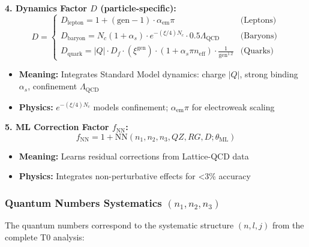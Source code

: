 	\textbf{4. Dynamics Factor $D$ (particle-specific):}
	\begin{equation}
		D = 
		\begin{cases} 
			D_{\text{lepton}} = 1 + (\text{gen} - 1) \cdot \alpha_{\text{em}} \pi & \text{(Leptons)} \\
			D_{\text{baryon}} = N_c (1 + \alpha_s) \cdot e^{-(\xi/4) N_c} \cdot 0.5 \Lambda_{\text{QCD}} & \text{(Baryons)} \\
			D_{\text{quark}} = |Q| \cdot D_f \cdot (\xi^{\text{gen}}) \cdot (1 + \alpha_s \pi n_{\text{eff}}) \cdot \frac{1}{\text{gen}^{1.2}} & \text{(Quarks)}
		\end{cases}
	\end{equation}
	\begin{itemize}
		\item \textbf{Meaning:} Integrates Standard Model dynamics: charge $|Q|$, strong binding $\alpha_s$, confinement $\Lambda_{\text{QCD}}$
		\item \textbf{Physics:} $e^{-(\xi/4) N_c}$ models confinement; $\alpha_{\text{em}} \pi$ for electroweak scaling
	\end{itemize}
	
	\textbf{5. ML Correction Factor $f_{\text{NN}}$:}
	\begin{equation}
		f_{\text{NN}} = 1 + \text{NN}(n_1, n_2, n_3, QZ, RG, D; \theta_{\text{ML}})
	\end{equation}
	\begin{itemize}
		\item \textbf{Meaning:} Learns residual corrections from Lattice-QCD data
		\item \textbf{Physics:} Integrates non-perturbative effects for <3\% accuracy
	\end{itemize}
	
	\subsubsection{Quantum Numbers Systematics $(n_1, n_2, n_3)$}
	
	The quantum numbers correspond to the systematic structure $(n, l, j)$ from the complete T0 analysis:
	
